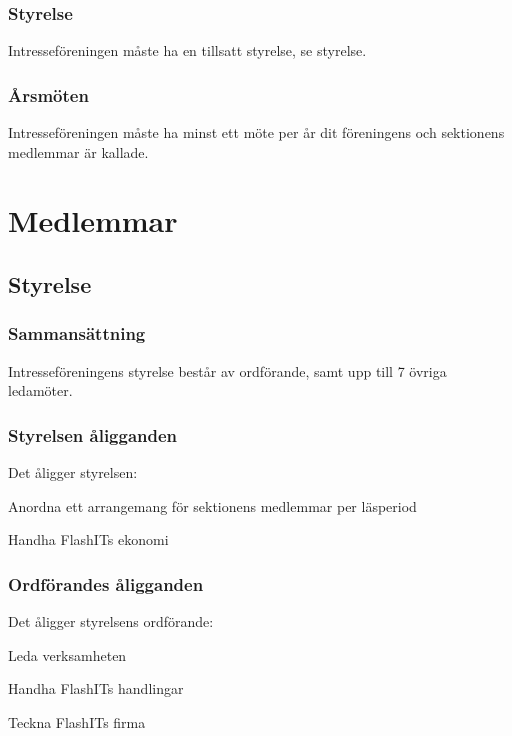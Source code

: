 \documentclass[11pt, noincludeaddress]{classes/cthit}
\begin{document}
\subsubsection{Styrelse}
Intresseföreningen måste ha en tillsatt styrelse, se {styrelse}.

\subsubsection{Årsmöten}
Intresseföreningen måste ha minst ett möte per år dit föreningens 
och sektionens medlemmar är kallade.

\newpage

\section{Medlemmar}

\subsection{Styrelse}
\label{styrelse}

\subsubsection{Sammansättning}
Intresseföreningens styrelse består av ordförande, samt upp till 7
övriga ledamöter.

\subsubsection{Styrelsen åligganden}
Det åligger styrelsen:

\begin{att}
        \item Anordna ett arrangemang för sektionens medlemmar per läsperiod
        \item Handha FlashITs ekonomi
\end{att}

\subsubsection{Ordförandes åligganden}
Det åligger styrelsens ordförande:

\begin{att}
        \item Leda verksamheten
        \item Handha FlashITs handlingar
        \item Teckna FlashITs firma
\end{att}
\end{document}
